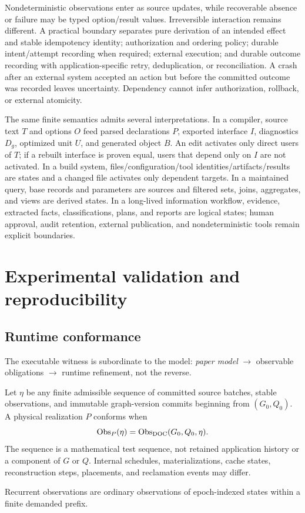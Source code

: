 Nondeterministic observations enter as source updates, while recoverable absence or failure may be typed option/result values. Irreversible interaction remains different. A practical boundary separates pure derivation of an intended effect and stable idempotency identity; authorization and ordering policy; durable intent/attempt recording when required; external execution; and durable outcome recording with application-specific retry, deduplication, or reconciliation. A crash after an external system accepted an action but before the committed outcome was recorded leaves uncertainty. Dependency cannot infer authorization, rollback, or external atomicity.

The same finite semantics admits several interpretations. In a compiler, source text $T$ and options $O$ feed parsed declarations $P$, exported interface $I$, diagnostics $D_g$, optimized unit $U$, and generated object $B$. An edit activates only direct users of $T$; if a rebuilt interface is proven equal, users that depend only on $I$ are not activated. In a build system, files/configuration/tool identities/artifacts/results are states and a changed file activates only dependent targets. In a maintained query, base records and parameters are sources and filtered sets, joins, aggregates, and views are derived states. In a long-lived information workflow, evidence, extracted facts, classifications, plans, and reports are logical states; human approval, audit retention, external publication, and nondeterministic tools remain explicit boundaries.

\section{Experimental validation and reproducibility}\label{sec:validation}
\subsection{Runtime conformance}
The executable witness is subordinate to the model: \emph{paper model} $\to$ observable obligations $\to$ runtime refinement, not the reverse.

\begin{definition}\label{def:trace}
Let $\eta$ be any finite admissible sequence of committed source batches, stable observations, and immutable graph-version commits beginning from $(G_0,Q_0)$. A physical realization $P$ conforms when
\[
\operatorname{Obs}_P(\eta)=\operatorname{Obs}_{\mathrm{DOC}}(G_0,Q_0,\eta).
\]
The sequence is a mathematical test sequence, not retained application history or a component of $G$ or $Q$. Internal schedules, materializations, cache states, reconstruction steps, placements, and reclamation events may differ.
\end{definition}
Recurrent observations are ordinary observations of epoch-indexed states within a finite demanded prefix.


